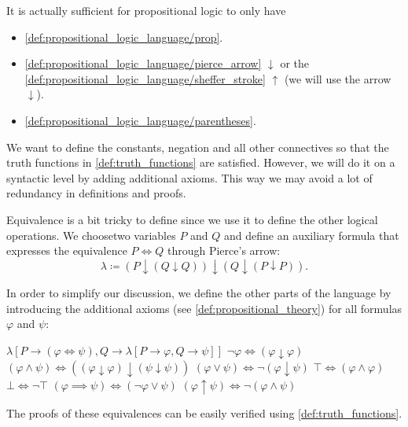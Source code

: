 \begin{remark}\label{remark:minimal_propositional_language}
  It is actually sufficient for propositional logic to only have
  \begin{itemize}
    \item \ref{def:propositional_logic_language/prop}.
    \item \ref{def:propositional_logic_language/pierce_arrow} \( \downarrow \) or the \ref{def:propositional_logic_language/sheffer_stroke} \( \uparrow \) (we will use the arrow \( \downarrow \)).
    \item \ref{def:propositional_logic_language/parentheses}.
  \end{itemize}

  We want to define the constants, negation and all other connectives so that the truth functions in \cref{def:truth_functions} are satisfied. However, we will do it on a syntactic level by adding additional axioms. This way we may avoid a lot of redundancy in definitions and proofs.

  Equivalence is a bit tricky to define since we use it to define the other logical operations. We choose\AOC two variables \( P \) and \( Q \) and define an auxiliary formula that expresses the equivalence \( P \iff Q \) through Pierce's arrow:
  \begin{equation*}
    \lambda \coloneqq (P \downarrow (Q \downarrow Q)) \downarrow (Q \downarrow (P \downarrow P)).
  \end{equation*}

  In order to simplify our discussion, we define the other parts of the language by introducing the additional axioms (see \cref{def:propositional_theory}) for all formulas \( \varphi \) and \( \psi \):
  \begin{description}
     \( \lambda[P \to (\varphi \iff \psi), Q \to \lambda[P \to \varphi, Q \to \psi]] \)
     \( \neg \varphi \iff (\varphi \downarrow \varphi) \)
     \( (\varphi \land \psi) \iff ((\varphi \downarrow \varphi) \downarrow (\psi \downarrow \psi)) \)
     \( (\varphi \lor \psi) \iff \neg (\varphi \downarrow \psi) \)
     \( \top \iff (\varphi \land \varphi) \)
     \( \bot \iff \neg \top \)
     \( (\varphi \implies \psi) \iff (\neg \varphi \lor \psi) \)
     \( (\varphi \uparrow \psi) \iff \neg (\varphi \land \psi) \)
  \end{description}

  The proofs of these equivalences can be easily verified using \cref{def:truth_functions}.
\end{remark}

